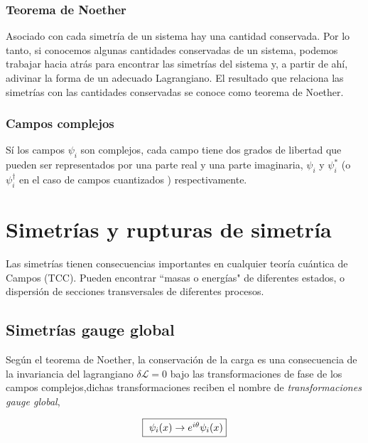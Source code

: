 \documentclass[12pt]{article}
\begin{document}

\subsubsection{Teorema de Noether}

Asociado con cada simetría de un sistema hay una cantidad conservada. Por lo tanto, si conocemos algunas cantidades conservadas de un sistema, podemos trabajar hacia atrás para encontrar las simetrías del sistema y, a partir de ahí, adivinar la forma de un adecuado Lagrangiano. El resultado que relaciona las simetrías con las cantidades conservadas se conoce como teorema de Noether. 

\subsubsection{Campos complejos}

Sí los campos $\psi_i$ son complejos, cada campo tiene dos grados de libertad que pueden ser representados por una parte real y una parte imaginaria, $\psi_i$ y $\psi_i^ *$ (o $\psi_i^\dagger$ en el caso de campos cuantizados ) respectivamente. 

\section{Simetrías y rupturas de simetría}

Las simetrías tienen consecuencias importantes en cualquier teoría cuántica de Campos (TCC). Pueden encontrar ``masas o energías"
de diferentes estados, o dispersión de secciones transversales de diferentes procesos. 

\subsection{Simetrías gauge global}

Según el teorema de Noether, la conservación de la carga es una consecuencia de la invariancia del lagrangiano $\delta \mathcal{L}=0 $ bajo las transformaciones de fase de los campos complejos,dichas transformaciones reciben el nombre de \textit{transformaciones gauge global}, 

\begin{equation}
   \fbox{ $ \psi_i(x) \rightarrow e ^ {i\theta}\psi_i(x)$}
   \label{eq:gaugeglobal}
\end{equation} \\
\end{document}
